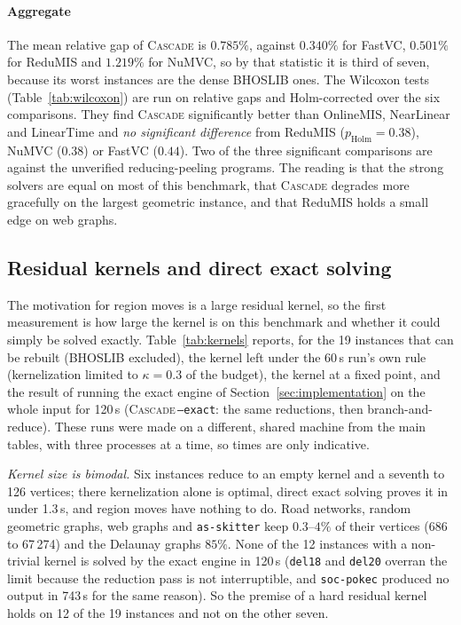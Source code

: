 \documentclass[pdflatex,sn-mathphys-num]{sn-jnl}
\theoremstyle{thmstyleone}%
\theoremstyle{thmstyletwo}%
\begin{document}
\paragraph{Aggregate} The mean relative gap of \textsc{Cascade} is $0.785\%$, against
$0.340\%$ for FastVC, $0.501\%$ for ReduMIS and $1.219\%$ for NuMVC, so by that
statistic it is third of seven, because its worst instances are the dense BHOSLIB ones.
The Wilcoxon tests (Table~\ref{tab:wilcoxon}) are run on relative gaps and
Holm-corrected over the six comparisons. They find \textsc{Cascade} significantly
better than OnlineMIS, NearLinear and LinearTime and \emph{no significant difference}
from ReduMIS ($p_{\mathrm{Holm}}=0.38$), NuMVC ($0.38$) or FastVC ($0.44$). Two of the
three significant comparisons are against the unverified reducing-peeling programs. The
reading is that the strong solvers are equal on most of this benchmark, that
\textsc{Cascade} degrades more gracefully on the largest geometric instance, and that
ReduMIS holds a small edge on web graphs.

\subsection{Residual kernels and direct exact solving}
\label{sec:kernels}

The motivation for region moves is a large residual kernel, so the first measurement
is how large the kernel is on this benchmark and whether it could simply be solved
exactly. Table~\ref{tab:kernels} reports, for the 19 instances that can be rebuilt
(BHOSLIB excluded), the kernel left under the 60\,s run's own rule (kernelization
limited to $\kappa=0.3$ of the budget), the kernel at a fixed point, and the result of
running the exact engine of Section~\ref{sec:implementation} on the whole input for
120\,s (\textsc{Cascade}\,\texttt{--exact}: the same reductions, then
branch-and-reduce). These runs were made on a different, shared machine from the main
tables, with three processes at a time, so times are only indicative.



\emph{Kernel size is bimodal.} Six instances reduce to an empty kernel and a seventh to
126 vertices; there kernelization alone is optimal, direct exact solving proves it in
under 1.3\,s, and region moves have nothing to do. Road networks, random geometric
graphs, web graphs and \texttt{as-skitter} keep $0.3$--$4\%$ of their vertices (686 to
67\,274) and the Delaunay graphs $85\%$. None of the 12 instances with a non-trivial
kernel is solved by the exact engine in 120\,s (\texttt{del18} and \texttt{del20}
overran the limit because the reduction pass is not interruptible, and \texttt{soc-pokec}
produced no output in 743\,s for the same reason). So the premise of a hard residual
kernel holds on 12 of the 19 instances and not on the other seven.
\end{document}

